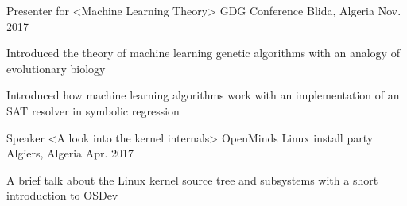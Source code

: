 

\begin{cventries}

  \cventry
    {Presenter for <Machine Learning Theory>} %
    {GDG Conference} %
    {Blida, Algeria} %
    {Nov. 2017} %
    {
      \begin{cvitems} %
        \item {Introduced the theory of machine learning genetic algorithms with an analogy of evolutionary biology}
        \item {Introduced how machine learning algorithms work with an implementation of an SAT resolver in symbolic regression}
      \end{cvitems}
    }

  \cventry
    {Speaker <A look into the kernel internals>} %
    {OpenMinds Linux install party} %
    {Algiers, Algeria} %
    {Apr. 2017} %
    {
      \begin{cvitems} %
        \item {A brief talk about the Linux kernel source tree and subsystems with a short introduction to OSDev}
      \end{cvitems}
    }

\end{cventries}
